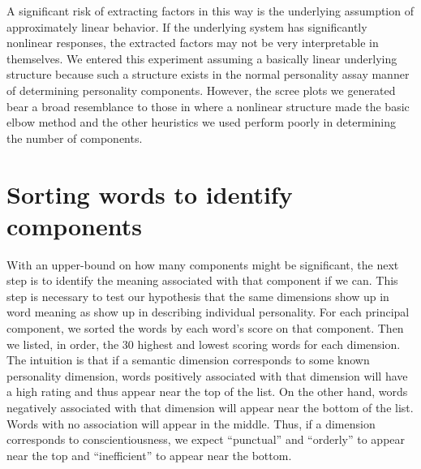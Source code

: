 \documentclass[eric_thesis.tex]{subfiles}
\begin{document}
A significant risk of extracting factors in this way is the underlying 
assumption of approximately linear behavior. If the underlying system has 
significantly nonlinear responses, the extracted factors may not be very 
interpretable in themselves. We entered this experiment assuming a basically 
linear underlying structure because such a structure exists in the normal 
personality assay manner of determining personality components. However, the 
scree plots we generated bear a broad resemblance to those in  where a nonlinear structure made the basic 
elbow method and the other heuristics we used perform poorly in determining the 
number of components.


\section{Sorting words to identify components}

With an upper-bound on how many components might be significant, the next 
step is to identify the meaning associated with that component if we can. This 
step is necessary to test our hypothesis that the same dimensions show up in 
word meaning as show up in describing individual personality. For each 
principal 
component, we sorted the words by each word's score on that component. Then we 
listed, in order, the 30 highest and lowest scoring words for each dimension. 
The intuition is that if a semantic dimension corresponds to some known 
personality dimension, words positively associated with that dimension will 
have 
a high rating and thus appear near the top of the list. On the other hand, 
words 
negatively associated with that dimension will appear near the bottom of the 
list. Words with no association will appear in the middle. Thus, if a dimension 
corresponds to conscientiousness, we expect ``punctual'' and ``orderly'' to 
appear near the top and ``inefficient'' to appear near the bottom.
\end{document}
